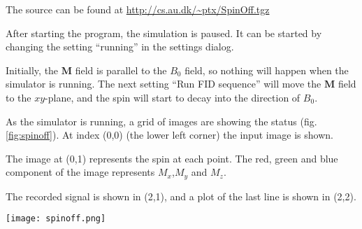 
The source can be found at \url{http://cs.au.dk/~ptx/SpinOff.tgz}

After starting the program, the simulation is paused. It can be
started by changing the setting ``running'' in the settings dialog.

Initially, the $\textbf{M}$ field is parallel to the $B_0$ field, so nothing
will happen when the simulator is running. The next setting ``Run FID
sequence'' will move the $\textbf{M}$ field to the $xy$-plane, and the spin
will start to decay into the direction of $B_0$.

As the simulator is running, a grid of images are showing the status
(fig. \ref{fig:spinoff}). At index (0,0) (the lower left corner) the
input image is shown.


The image at (0,1) represents the spin at each point. The red, green
and blue component of the image represents $M_x$,$M_y$ and $M_z$.

The recorded signal is shown in (2,1), and a plot of the last line is
shown in (2,2).

\begin{figure*}
  \texttt{[image: spinoff.png]}
  \caption{Simulator}
  \label{fig:spinoff}
\end{figure*}

